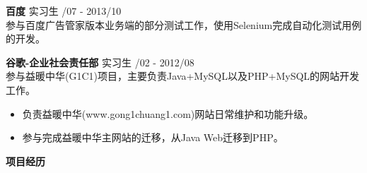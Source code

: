 \documentclass[a4paper]{article}
\newenvironment{changemargin}[2]{%
  \begin{list}{}{%
    \setlength{\topsep}{0pt}%
    \setlength{\leftmargin}{#1}%
    \setlength{\rightmargin}{#2}%
    \setlength{\listparindent}{\parindent}%
    \setlength{\itemindent}{\parindent}%
    \setlength{\parsep}{\parskip}%
  }%
  \item[]}{\end{list}
}
\newcommand{\lineover}{
	\begin{changemargin}{-0.05in}{-0.05in}
		\vspace*{-8pt}
		\hrulefill \\
		\vspace*{-2pt}
	\end{changemargin}
}
\newcommand{\header}[1]{
	\begin{changemargin}{-0.5in}{-0.5in}
	\fontsize{12}{14} \scshape{\textbf{#1}}\\
	\end{changemargin}
}
\newenvironment{body} {
	\vspace*{-16pt}
	\begin{changemargin}{-0.5in}{-0.5in}
  }	
	{\end{changemargin}
}
\begin{document}
\begin{body}
	\vspace{10pt}
	\textbf{百度} \hfill 实习生 {/07 - 2013/10}\\ 
	\smallskip
	参与百度广告管家{}版本业务端的部分测试工作，使用{\fontarial Selenium}完成自动化测试用例的开发。

	\vspace{10pt}
	\textbf{谷歌-企业社会责任部} \hfill 实习生 {/02 - 2012/08}\\ 
	\smallskip
	参与益暖中华{\fontarial (G1C1)}项目，主要负责{\fontarial Java+MySQL}以及{\fontarial PHP+MySQL}的网站开发工作。\\ 
	\vspace*{-6pt}
	\begin{itemize} \itemsep -0pt  %
		\item 负责益暖中华{\fontarial(www.gong1chuang1.com)}网站日常维护和功能升级。\\
	\end{itemize}
	\vspace*{-12pt}
	\begin{itemize} \itemsep -0pt  %
		\item 参与完成益暖中华主网站的迁移，从{\fontarial Java Web}迁移到{\fontarial PHP}。\\
	\end{itemize}

\end{body}

\medskip

\header{项目经历}
\end{document}
